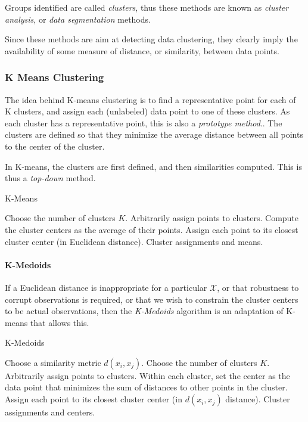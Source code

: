 \documentclass[12pt,a4paper]{article}
\theoremstyle{plain}
\theoremstyle{definition}
\newcommand{\featureS}{\mathcal{X}}
\newcommand{\similarity}{d}
\begin{document}
Groups identified are called \emph{clusters}, thus these methods are known as \emph{cluster analysis}, or \emph{data segmentation} methods.

Since these methods are aim at detecting data clustering, they clearly imply the availability of some measure of distance, or similarity, between data points. 


\subsubsection{K Means Clustering}
\label{sec:kmeans}
The idea behind K-means clustering is to find a representative point for each of K clusters, and assign each (unlabeled) data point to one of these clusters. As each cluster has a representative point, this is also a \emph{prototype method}..
The clusters are defined so that they minimize the average distance between all points to the center of the cluster.

In K-means, the clusters are first defined, and then similarities computed. This is thus a \emph{top-down} method.

\begin{algorithm}[H]
\caption{K-Means}
\begin{algorithmic}
\State Choose the number of clusters $K$.
\State Arbitrarily assign points to clusters.
	\State Compute the cluster centers as the average of their points.
	\State Assign each point to its closest cluster center (in Euclidean distance).
\EndWhile
\State \Return Cluster assignments and means.
\end{algorithmic}
\end{algorithm}



\paragraph{K-Medoids}
If a Euclidean distance is inappropriate for a particular $\featureS$, or that robustness to corrupt observations is required, or that we wish to constrain the cluster centers to be actual observations, then the \emph{K-Medoids} algorithm is an adaptation of K-means that allows this.

\begin{algorithm}[H]
\caption{K-Medoids}
\begin{algorithmic}
\State Choose a similarity metric $\similarity(x_i,x_j)$.
\State Choose the number of clusters $K$.
\State Arbitrarily assign points to clusters.
	\State Within each cluster, set the center as the data point that minimizes the sum of distances to other points in the cluster.
	\State Assign each point to its closest cluster center (in $\similarity(x_i,x_j)$ distance).
\EndWhile
\State \Return Cluster assignments and centers.
\end{algorithmic}
\end{algorithm}
\end{document}
